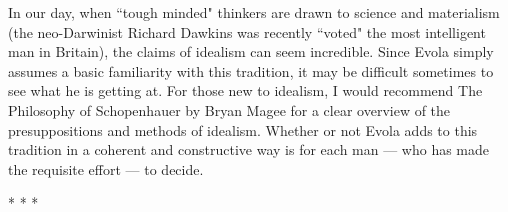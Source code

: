 In our day, when ``tough minded" thinkers are drawn to science and materialism (the neo-Darwinist Richard Dawkins was recently ``voted" the most intelligent man in Britain), the claims of idealism can seem incredible. Since Evola simply assumes a basic familiarity with this tradition, it may be difficult sometimes to see what he is getting at. For those new to idealism, I would recommend The Philosophy of Schopenhauer by Bryan Magee for a clear overview of the presuppositions and methods of idealism. Whether or not Evola adds to this tradition in a coherent and constructive way is for each man — who has made the requisite effort — to decide.




\begin{center}* * *\end{center}


